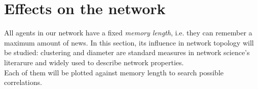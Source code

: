 
\section{Effects on the network}
All agents in our network have a fixed \textit{memory length}, i.e. they can remember a maximum
 amount of news.
In this section, its influence in network topology will be studied: clustering and
 diameter are standard measures in network science's literarure and widely used to describe
 network properties.\\
  Each of them will be plotted
 against memory length to search possible correlations.


